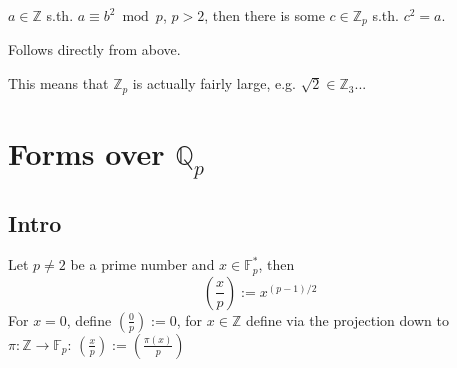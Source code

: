 \begin{beispiel}
  $a\in \mathbb Z$ s.th. $a\equiv b^2\bmod p$, $p>2$, then
  there is some $c\in\mathbb Z_p$ s.th. $c^2 = a$.

  Follows directly from above.

  This means that $\mathbb Z_p$ is actually fairly large, e.g.
  $\sqrt 2\in \mathbb Z_3$...
\end{beispiel}

\chapter{Forms over $\mathbb Q_p$}
\section{Intro}
\def\legendre#1#2{\left(\frac{#1}{#2}\right)}
\begin{definition}
Let $p\ne2$ be a prime number and $x\in \mathbb F_p^*$, then
$$\legendre x p := x^{(p-1)/2}$$
For $x=0$, define $\legendre 0 p := 0$, for $x\in \mathbb Z$
define via the projection down to $\pi:\mathbb Z \to \mathbb F_p$:
$\legendre x p := \legendre{\pi(x)} p$
\end{definition}

